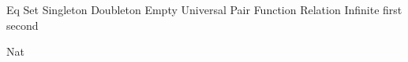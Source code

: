 \def\Llam#1#2{\lambda\,{#1}\,.\,{#2}}
\def\Lmac#1{\underline{\mathtt{#1}}}
\def\Lfinto{\rightarrow\mathrel{\kern-.8em}\rightarrow}
\def\Lnum#1{{\underline{#1}}}
\def\lamstep{\mathrel{\;\triangleright_{\kern-.4em}{}_{\phantom{\beta}}\;}}
\def\invstep{\phantom{\lamstep}}
\def\betastep{\mathrel{\;\triangleright_{\kern-.4em{}_\beta}\;}}
\def\etastep{\mathrel{\;\triangleright_{\kern-.4em{}_\eta}\;}}
\def\alphastep{\mathrel{\;\triangleright_{\kern-.4em{}_\alpha}\;}}
\let\lstep=\lamstep
\let\istep=\invstep
\let\bstep=\betastep
\let\estep=\etastep
\let\astep=\alphastep
\def\lameq{\mathrel{\,=\,}}
\def\isteq{\istep\lameq}%
\def\redex#1{\underline{#1}}

\def\C#1{{\mathord{\mathsfmbf{#1}}}}
\def\Cto{\mathrel{\triangleright}}
\def\cI{{\C I}}
\def\cK{{\C K}}
\def\cM{{\C M}}
\def\cC{{\C C}}
\def\cS{{\C S}}
\def\cW{{\C W}}
\def\cB{{\C B}}
\def\cR{{\C R}}
\def\cV{{\C V}}
\def\cBp{{{\C B}'}}

\let\knuthsetminus=\setminus
\def\setminus{\mathbin{\knuthsetminus}}
\def\cantorcard#1{\overline{\overline{#1}}}
\def\cantorset{{\frak C}}
\def\continuum{\euf{c}}
\def\finord#1{\overline{#1}}
\def\eqc{\mathrel{=_{\namedop{c}}}}
\def\neqc{\mathrel{\not\eqc}}
\def\leqc{\mathrel{\leq_{\namedop{c}}}}
\def\geqc{\mathrel{\geq_{\namedop{c}}}}
\def\gtc{\mathrel{>_{\namedop{c}}}}
\def\ltc{\mathrel{<_{\namedop{c}}}}
\def\Univ{{\bbb V}}
\def\complement#1{\widetilde{#1}}
\let\compl=\complement
\def\russell#1{{\mathbf{r}(#1)}}
\def\metain{\mathrel{\in\kern-0.425em\in}}
\let\inclass=\metain
\def\classst#1#2{\pmbb{\{}\;{#1}\;\st \;{#2}\;\pmbb{\}}}
\def\classstt#1#2{\pmbb{\{}\;{#1}\;\st \;{\text{#2}}\;\pmbb{\}}}
\def\classimg#1#2{{#1}{\pmbb[}\,{#2}\,{\pmbb]}}
\let\clsimg=\classimg
\def\universet{{\cal U}}
\DefRel Eq
\DefRel Set
\DefRel Singleton
\DefRel Doubleton
\DefRel Empty
\DefRel Universal
\DefRel Pair
\DefRel Function
\DefRel Relation
\DefRel Infinite
\DefFun first
\DefFun second
\def\kurpair#1#2{\set{\set{#1}, \set{{#1}, {#2}}}}
\def\disjunion{\mathbin{\uplus}}
\def\Disjunion{\mathop{\biguplus}}
\let\dunion=\disjunion
\let\Dunion=\Disjunion
\def\setsucc#1{{#1}{}^+}
\def\kleenestar#1{{#1}^\star}
\def\kleenestarp#1{\paren{#1}^\star}
\let\kstar=\kleenestar
\let\kstarp=\kleenestarp

\def\type#1{{\namedtype{#1}}}
\DefType Nat
\def\oftype{\mathrel{:}}
\let\is=\oftype
\def\rule#1{{\scshape #1}}
\def\rulelabel#1{{\smaller\scshape #1}}

